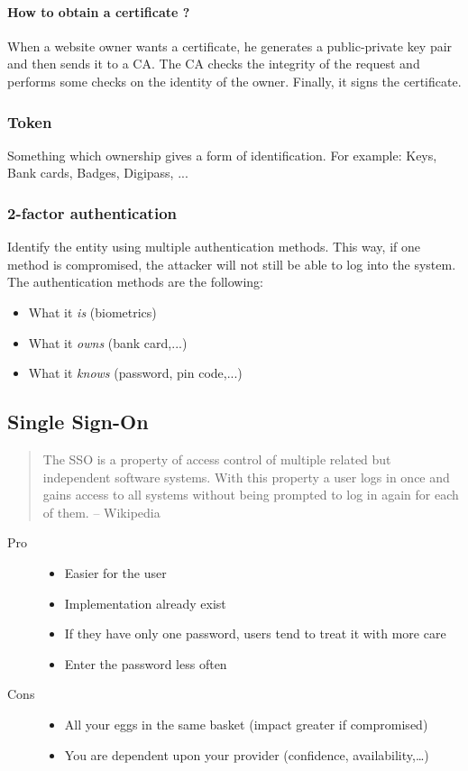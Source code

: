 \paragraph{How to obtain a certificate ?}
When a website owner wants a certificate, he generates a public-private key
pair and then sends it to a CA.
The CA checks the integrity of the request and performs some checks on the
identity of the owner. Finally, it signs the certificate.

\subsubsection{Token}
Something which ownership gives a form of identification.
For example: Keys, Bank cards, Badges, Digipass, ...

\subsubsection{2-factor authentication}
Identify the entity using multiple authentication methods.
This way, if one method is compromised, the attacker will not still be able to
log into the system.
The authentication methods are the following:
\begin{itemize}
\item What it \emph{is} (biometrics)
\item What it \emph{owns} (bank card,...)
\item What it \emph{knows} (password, pin code,...)
\end{itemize}

\subsection{Single Sign-On}
\begin{quote}
The SSO is a property of access control of multiple related but independent
software systems. With this property a user logs in once and gains access to
all systems without being prompted to log in again for each of them.
-- Wikipedia
\end{quote}

\begin{description}
\item[Pro]
\hfill
\begin{itemize}
\item Easier for the user
\item Implementation already exist
\item If they have only one password, users tend to treat it with more care
\item Enter the password less often
\end{itemize}
\item[Cons]
\hfill
\begin{itemize}
\item All your eggs in the same basket (impact greater if compromised)
\item You are dependent upon your provider (confidence, availability,\ldots)
\end{itemize}
\end{description}

